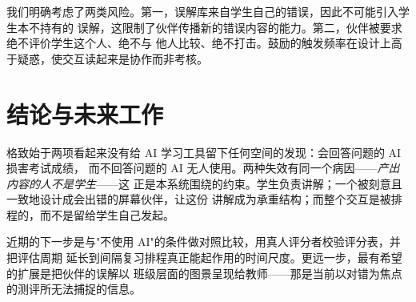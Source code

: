 \documentclass[11pt,a4paper,UTF8,fontset=windows]{ctexart}
\begin{document}
我们明确考虑了两类风险。第一，误解库来自学生自己的错误，因此不可能引入学生本不持有的
误解，这限制了伙伴传播新的错误内容的能力。第二，伙伴被要求绝不评价学生这个人、绝不与
他人比较、绝不打击。鼓励的触发频率在设计上高于疑惑，使交互读起来是协作而非考核。

\section{结论与未来工作}

格致始于两项看起来没有给 AI 学习工具留下任何空间的发现：会回答问题的 AI 损害考试成绩，
而不回答问题的 AI 无人使用。两种失效有同一个病因——\emph{产出内容的人不是学生}——这
正是本系统围绕的约束。学生负责讲解；一个被刻意且一致地设计成会出错的屏幕伙伴，让这份
讲解成为承重结构；而整个交互是被排程的，而不是留给学生自己发起。

近期的下一步是与"不使用 AI"的条件做对照比较，用真人评分者校验评分表，并把评估周期
延长到间隔复习排程真正能起作用的时间尺度。更远一步，最有希望的扩展是把伙伴的误解以
班级层面的图景呈现给教师——那是当前以对错为焦点的测评所无法捕捉的信息。
\end{document}

